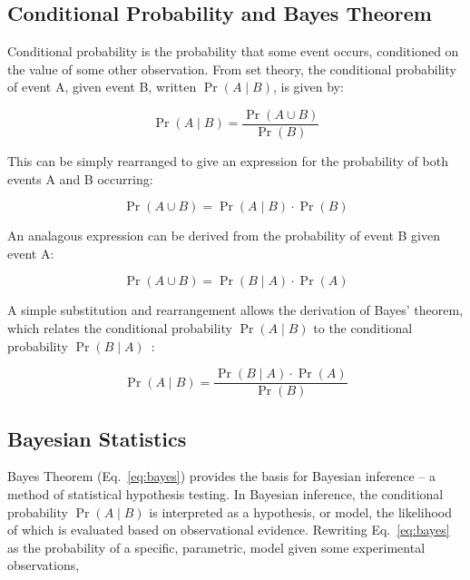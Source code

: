 
\subsection{Conditional Probability and Bayes Theorem}
Conditional probability is the probability that some event occurs, conditioned on the value of some other observation. From set theory, the conditional probability of event A, given event B, written $\Pr(A \mid B)$, is given by: 

\begin{equation}
\Pr(A \mid B) = \frac{\Pr(A \cup B)}{\Pr(B)}
\label{eq:conditional}
\end{equation}

This can be simply rearranged to give an expression for the probability of both events A and B occurring:

\begin{equation}
\Pr(A \cup B) = \Pr(A \mid B) \cdot \Pr(B) 
\label{eq:conditional_and}
\end{equation}

An analagous expression can be derived from the probability of event B given event A:


\begin{equation}
\Pr(A \cup B) = \Pr(B \mid A) \cdot \Pr(A) 
\label{eq:conditional_and}
\end{equation}

A simple substitution and rearrangement allows the derivation of Bayes' theorem, which relates the conditional probability $\Pr(A \mid B)$ to the conditional probability $\Pr(B \mid A)$~\cite{barberBRML2012}:

\begin{equation}
\Pr(A \mid B) = \frac{\Pr(B \mid A) \cdot \Pr(A)}{\Pr(B)} 
\label{eq:bayes}
\end{equation}
 
\subsection{Bayesian Statistics}
Bayes Theorem (Eq.~\ref{eq:bayes}) provides the basis for Bayesian inference -- a method of statistical hypothesis testing. In Bayesian inference, the conditional probability $\Pr(A \mid B)$ is interpreted as a hypothesis, or model, the likelihood of which is evaluated based on observational evidence. Rewriting Eq.~\ref{eq:bayes} as the probability of a specific, parametric, model given some experimental observations, 

